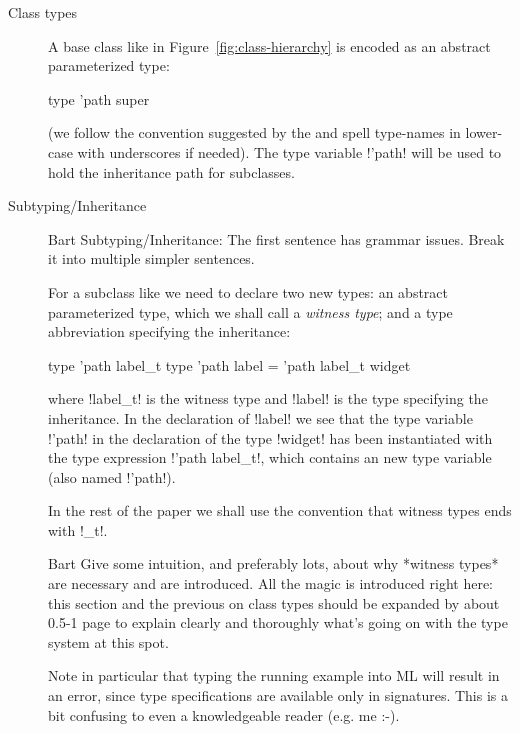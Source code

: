 \documentclass[workingdraft]{usetex-v1}
\begin{document}
\begin{description}
\item[Class types] A base class like  in
  Figure~\ref{fig:class-hierarchy} is encoded as an abstract
  parameterized type:
\begin{SMLcode}
type 'path super
\end{SMLcode}
(we follow the convention suggested by the \smlbasis and spell
type-names in lower-case with underscores if needed).  The type
variable !'path! will be used to hold the inheritance path for
subclasses.


\item[Subtyping/Inheritance] 

  \begin{ednote}{Bart}
      Subtyping/Inheritance: The first sentence has grammar
  issues.  Break it into multiple simpler sentences.

  \end{ednote}

  For a subclass like 
  we need to declare two new \sml types: an abstract parameterized
  type, which we shall call a \emph{witness type}; and a type
  abbreviation specifying the inheritance:
\begin{SMLcode}
type 'path label_t
type 'path label = 
        'path label_t widget
\end{SMLcode}
where !label_t! is the witness type and !label! is the
type specifying the inheritance.  In the declaration of !label!
we see that the type variable !'path! in the declaration of the type
!widget! has been instantiated with the type expression 
!'path label_t!, which contains an new type variable (also named
!'path!).

In the rest of the paper we shall use the convention that witness
types ends with !_t!.

\begin{ednote}{Bart}
    Give some intuition, and preferably lots, about why *witness
  types* are necessary and are introduced.  All the magic is
  introduced right here: this section and the previous on
  class types should be expanded by about 0.5-1 page to
  explain clearly and thoroughly what's going on with the type
  system at this spot.  
  
  Note in particular that typing the running example into ML will
  result in an error, since type specifications are available only in
  signatures.  This is a bit confusing to even a knowledgeable reader
  (e.g. me :-).
\end{ednote}


\end{description}
\end{document}
